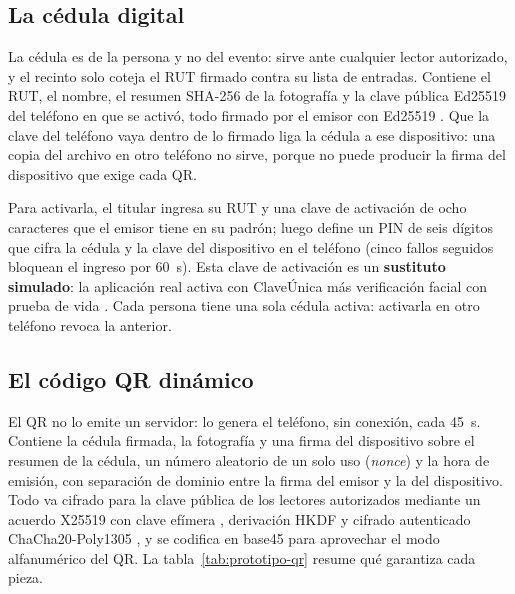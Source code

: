\subsection{La cédula digital}
\label{sec:prototipo-cedula}

La cédula es de la persona y no del evento: sirve ante cualquier lector autorizado, y el recinto
solo coteja el RUT firmado contra su lista de entradas. Contiene el RUT, el nombre, el resumen
SHA-256 de la fotografía y la clave pública Ed25519 del teléfono en que se activó, todo firmado
por el emisor con Ed25519 \cite{PENDIENTE-rfc8032}. Que la clave del teléfono vaya dentro de lo
firmado liga la cédula a ese dispositivo: una copia del archivo en otro teléfono no sirve, porque
no puede producir la firma del dispositivo que exige cada QR.

Para activarla, el titular ingresa su RUT y una clave de activación de ocho caracteres que el
emisor tiene en su padrón; luego define un PIN de seis dígitos que cifra la cédula y la clave del
dispositivo en el teléfono (cinco fallos seguidos bloquean el ingreso por 60~s). Esta clave de
activación es un \textbf{sustituto simulado}: la aplicación real activa con ClaveÚnica más
verificación facial con prueba de vida \cite{PENDIENTE-activacion-app}. Cada persona tiene una sola
cédula activa: activarla en otro teléfono revoca la anterior.

\subsection{El código QR dinámico}
\label{sec:prototipo-qr}

El QR no lo emite un servidor: lo genera el teléfono, sin conexión, cada 45~s. Contiene la cédula
firmada, la fotografía y una firma del dispositivo sobre el resumen de la cédula, un número
aleatorio de un solo uso (\emph{nonce}) y la hora de emisión, con separación de dominio entre la
firma del emisor y la del dispositivo. Todo va cifrado para la clave pública de los lectores
autorizados mediante un acuerdo X25519 con clave efímera \cite{PENDIENTE-rfc7748}, derivación HKDF
\cite{PENDIENTE-rfc5869} y cifrado autenticado ChaCha20-Poly1305 \cite{PENDIENTE-rfc8439}, y se
codifica en base45 \cite{PENDIENTE-rfc9285} para aprovechar el modo alfanumérico del QR. La
tabla~\ref{tab:prototipo-qr} resume qué garantiza cada pieza.

